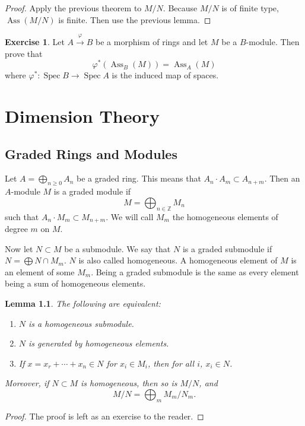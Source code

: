 \documentclass[leqno, openany]{memoir}
\newtheorem{lem}[thm]{Lemma}
\theoremstyle{definition}
\newtheorem{exer}[thm]{Exercise}
\theoremstyle{remark}
\theoremstyle{plain}
\theoremstyle{definition}
\theoremstyle{remark}
\newcommand{\Z}{\mathbb{Z}}
\DeclareMathOperator{\Spec}{Spec}
\DeclareMathOperator{\Ass}{Ass}
\begin{document}
\begin{proof} Apply the previous theorem to $M/N$. Because $M/N$ is of finite
type, $\Ass(M/N)$ is finite. Then use the previous lemma.  \end{proof}

\begin{exer} Let $A \xrightarrow{\varphi} B$ be a morphism of rings and let $M$
    be a $B$-module. Then prove that \[ \varphi^*(\Ass_B(M)) = \Ass_A(M) \]
where $\varphi^* \colon \Spec B \to \Spec A$ is the induced map of spaces.
\end{exer}

\chapter{Dimension Theory}%

\section{Graded Rings and Modules}%

Let $A = \bigoplus_{n \geq 0} A_n$ be a graded ring. This means that $A_n \cdot
A_m \subset A_{n+m}$. Then an $A$-module $M$ is a graded module if \[ M =
\bigoplus_{n \in \Z} M_n \] such that $A_n \cdot M_m \subset M_{n+m}$. We will
call $M_m$ the homogeneous elements of degree $m$ on $M$.

Now let $N \subset M$ be a submodule. We say that $N$ is a graded submodule if
$N = \bigoplus N \cap M_m$. $N$ is also called homogeneous. A homogeneous
element of $M$ is an element of some $M_m$. Being a graded submodule is the
same as every element being a sum of homogeneous elements.

\begin{lem} The following are equivalent: \begin{enumerate} \item $N$ is a
homogeneous submodule.  \item $N$ is generated by homogeneous elements.  \item
If $x = x_r + \cdots + x_n \in N$ for $x_i \in M_i$, then for all $i$, $x_i \in
N$.  \end{enumerate} Moreover, if $N \subset M$ is homogeneous, then so is
$M/N$, and \[ M/N = \bigoplus_m M_m / N_m. \] \end{lem}

\begin{proof} The proof is left as an exercise to the reader.  \end{proof}
\end{document}

